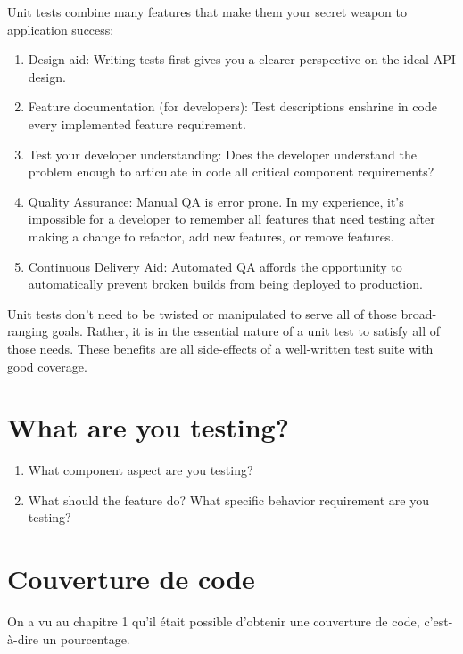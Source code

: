 \documentclass[11pt]{amsbook}
\begin{document}
Unit tests combine many features that make them your secret weapon to application success:


\begin{enumerate}

\item{Design aid: Writing tests first gives you a clearer perspective on the ideal API design.}

\item{Feature documentation (for developers): Test descriptions enshrine in code every implemented feature requirement.}

\item{Test your developer understanding: Does the developer understand the problem enough to articulate in code all critical component requirements?}

\item{Quality Assurance: Manual QA is error prone. In my experience, it’s impossible for a developer to remember all features that need testing after making a change to refactor, add new features, or remove features.}

\item{Continuous Delivery Aid: Automated QA affords the opportunity to automatically prevent broken builds from being deployed to production.}

\end{enumerate}


Unit tests don’t need to be twisted or manipulated to serve all of those broad-ranging goals. Rather, it is in the essential nature of a unit test to satisfy all of those needs. These benefits are all side-effects of a well-written test suite with good coverage.


\hypertarget{x-what-are-you-testing?}{\section{What are you testing?}}
\begin{enumerate}

\item{What component aspect are you testing?}

\item{What should the feature do? What specific behavior requirement are you testing?}

\end{enumerate}


\hypertarget{x-couverture-de-code}{\section{Couverture de code}}
On a vu au chapitre 1 qu’il était possible d’obtenir une couverture de code, c’est-à-dire un pourcentage.
\end{document}
